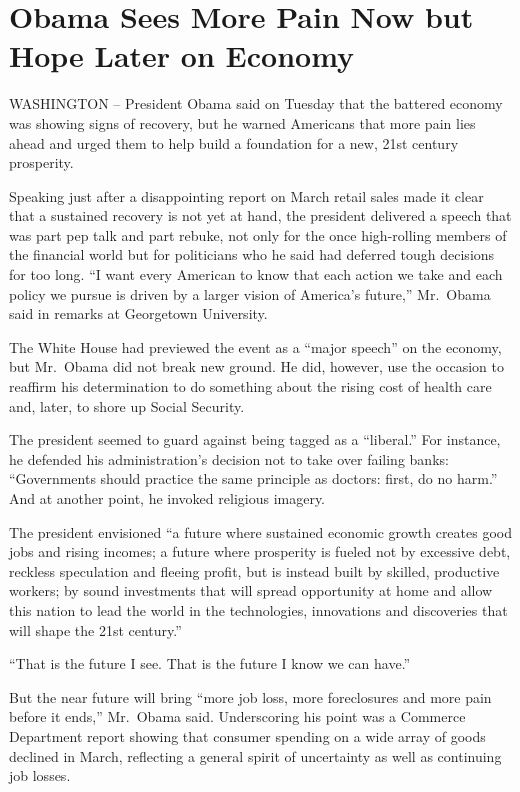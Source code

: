 \documentclass[12pt,a4paper,onecolumn]{article}
\begin{document}
\section{Obama Sees More Pain Now but Hope Later on Economy}

WASHINGTON -- President Obama said on Tuesday that the battered economy was showing signs of
recovery, but he warned Americans that more pain lies ahead and urged them to help build a
foundation for a new, 21st century prosperity.

Speaking just after a disappointing report on March retail sales made it clear that a sustained
recovery is not yet at hand, the president delivered a speech that was part pep talk and part
rebuke, not only for the once high-rolling members of the financial world but for politicians who he
said had deferred tough decisions for too long. ``I want every American to know that each action we
take and each policy we pursue is driven by a larger vision of America's future,'' Mr.~Obama said in
remarks at Georgetown University.

The White House had previewed the event as a ``major speech'' on the economy, but Mr.~Obama did not
break new ground. He did, however, use the occasion to reaffirm his determination to do something
about the rising cost of health care and, later, to shore up Social Security.

The president seemed to guard against being tagged as a ``liberal.'' For instance, he defended his
administration's decision not to take over failing banks: ``Governments should practice the same
principle as doctors: first, do no harm.'' And at another point, he invoked religious imagery.

The president envisioned ``a future where sustained economic growth creates good jobs and rising
incomes; a future where prosperity is fueled not by excessive debt, reckless speculation and fleeing
profit, but is instead built by skilled, productive workers; by sound investments that will spread
opportunity at home and allow this nation to lead the world in the technologies, innovations and
discoveries that will shape the 21st century.''

``That is the future I see. That is the future I know we can have.''

But the near future will bring ``more job loss, more foreclosures and more pain before it ends,''
Mr.~Obama said. Underscoring his point was a Commerce Department report showing that consumer
spending on a wide array of goods declined in March, reflecting a general spirit of uncertainty as
well as continuing job losses.
\end{document}
